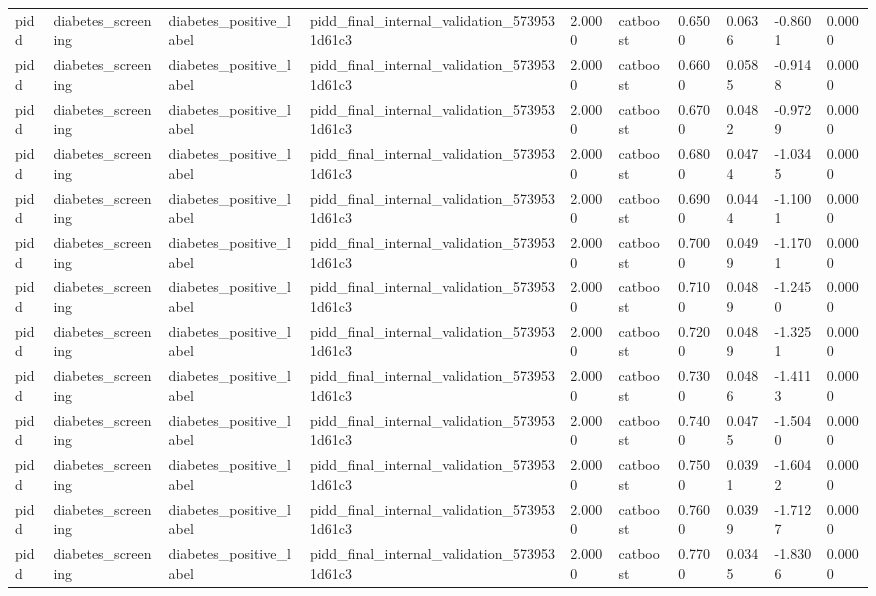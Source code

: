 \begin{tabular}{llllllllll}
pidd & diabetes\_screening & diabetes\_positive\_label & pidd\_final\_internal\_validation\_5739531d61c3 & 2.0000 & catboost & 0.6500 & 0.0636 & -0.8601 & 0.0000 \\
pidd & diabetes\_screening & diabetes\_positive\_label & pidd\_final\_internal\_validation\_5739531d61c3 & 2.0000 & catboost & 0.6600 & 0.0585 & -0.9148 & 0.0000 \\
pidd & diabetes\_screening & diabetes\_positive\_label & pidd\_final\_internal\_validation\_5739531d61c3 & 2.0000 & catboost & 0.6700 & 0.0482 & -0.9729 & 0.0000 \\
pidd & diabetes\_screening & diabetes\_positive\_label & pidd\_final\_internal\_validation\_5739531d61c3 & 2.0000 & catboost & 0.6800 & 0.0474 & -1.0345 & 0.0000 \\
pidd & diabetes\_screening & diabetes\_positive\_label & pidd\_final\_internal\_validation\_5739531d61c3 & 2.0000 & catboost & 0.6900 & 0.0444 & -1.1001 & 0.0000 \\
pidd & diabetes\_screening & diabetes\_positive\_label & pidd\_final\_internal\_validation\_5739531d61c3 & 2.0000 & catboost & 0.7000 & 0.0499 & -1.1701 & 0.0000 \\
pidd & diabetes\_screening & diabetes\_positive\_label & pidd\_final\_internal\_validation\_5739531d61c3 & 2.0000 & catboost & 0.7100 & 0.0489 & -1.2450 & 0.0000 \\
pidd & diabetes\_screening & diabetes\_positive\_label & pidd\_final\_internal\_validation\_5739531d61c3 & 2.0000 & catboost & 0.7200 & 0.0489 & -1.3251 & 0.0000 \\
pidd & diabetes\_screening & diabetes\_positive\_label & pidd\_final\_internal\_validation\_5739531d61c3 & 2.0000 & catboost & 0.7300 & 0.0486 & -1.4113 & 0.0000 \\
pidd & diabetes\_screening & diabetes\_positive\_label & pidd\_final\_internal\_validation\_5739531d61c3 & 2.0000 & catboost & 0.7400 & 0.0475 & -1.5040 & 0.0000 \\
pidd & diabetes\_screening & diabetes\_positive\_label & pidd\_final\_internal\_validation\_5739531d61c3 & 2.0000 & catboost & 0.7500 & 0.0391 & -1.6042 & 0.0000 \\
pidd & diabetes\_screening & diabetes\_positive\_label & pidd\_final\_internal\_validation\_5739531d61c3 & 2.0000 & catboost & 0.7600 & 0.0399 & -1.7127 & 0.0000 \\
pidd & diabetes\_screening & diabetes\_positive\_label & pidd\_final\_internal\_validation\_5739531d61c3 & 2.0000 & catboost & 0.7700 & 0.0345 & -1.8306 & 0.0000 \\

\end{tabular}
